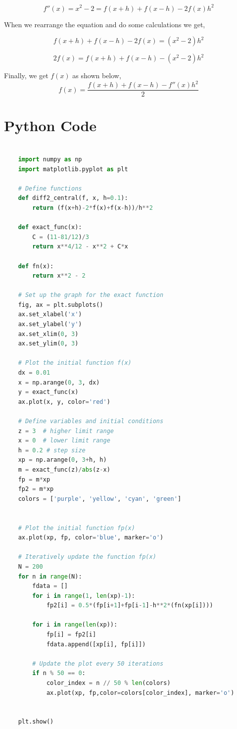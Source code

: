 \documentclass{article}
\begin{document}
$$f''(x) = x^2 - 2 = f(x+h) + f(x-h) - 2f(x)h^2$$

When we rearrange the equation and do some calculations we get,

$$f(x+h) + f(x-h) - 2f(x) = (x^2 - 2)h^2$$

$$2f(x) = f(x+h) + f(x-h) - (x^2 - 2)h^2$$

Finally, we get $f(x)$ as shown below,
$$ f(x) = \frac{f(x+h) + f(x-h) - f''(x)h^2}{2} $$


\section*{Python Code}
\begin{lstlisting}[language=Python]

    import numpy as np
    import matplotlib.pyplot as plt
    
    # Define functions
    def diff2_central(f, x, h=0.1):
        return (f(x+h)-2*f(x)+f(x-h))/h**2
    
    def exact_func(x):
        C = (11-81/12)/3
        return x**4/12 - x**2 + C*x
    
    def fn(x):
        return x**2 - 2
    
    # Set up the graph for the exact function
    fig, ax = plt.subplots()
    ax.set_xlabel('x')
    ax.set_ylabel('y')
    ax.set_xlim(0, 3)
    ax.set_ylim(0, 3)
    
    # Plot the initial function f(x)
    dx = 0.01
    x = np.arange(0, 3, dx)
    y = exact_func(x)
    ax.plot(x, y, color='red')
    
    # Define variables and initial conditions
    z = 3  # higher limit range
    x = 0  # lower limit range
    h = 0.2 # step size
    xp = np.arange(0, 3+h, h)
    m = exact_func(z)/abs(z-x)
    fp = m*xp
    fp2 = m*xp
    colors = ['purple', 'yellow', 'cyan', 'green']
    
    
    # Plot the initial function fp(x)
    ax.plot(xp, fp, color='blue', marker='o')
    
    # Iteratively update the function fp(x)
    N = 200
    for n in range(N):
        fdata = []
        for i in range(1, len(xp)-1):
            fp2[i] = 0.5*(fp[i+1]+fp[i-1]-h**2*(fn(xp[i])))
    
        for i in range(len(xp)):
            fp[i] = fp2[i]
            fdata.append([xp[i], fp[i]])
    
        # Update the plot every 50 iterations
        if n % 50 == 0:
            color_index = n // 50 % len(colors)
            ax.plot(xp, fp,color=colors[color_index], marker='o')
    
    
    plt.show()
    
  \end{lstlisting}
\end{document}
